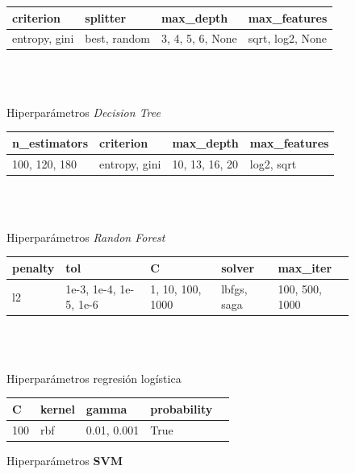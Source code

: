 			\begin{figure}[ht!]
				\centering
				\begin{tabular}{llll}
					\toprule
							criterion &        splitter &           max\_depth &      max\_features \\
					\midrule
					  entropy, gini &  best, random &  3, 4, 5, 6, None &  sqrt, log2, None \\
					\bottomrule
				\end{tabular}\\\\
				\caption{Hiperparámetros \emph{Decision Tree}}
				\label{table:2}
			\end{figure}
			
			\begin{figure}[ht!]
				\centering
				\begin{tabular}{llll}
					\toprule
					     n\_estimators &        criterion &          max\_depth &  max\_features \\
					\midrule
					  100, 120, 180 &  entropy, gini &  10,  13, 16, 20 &  log2, sqrt \\
					\bottomrule
				\end{tabular}\\\\
				\caption{Hiperparámetros \emph{Randon Forest}}
				\label{table:3}
			\end{figure}

			\begin{figure}[ht!]
				\centering
				\begin{tabular}{lllll}
					\toprule
					 penalty &                       tol &                   C &         solver &        max\_iter \\
					\midrule
					    l2 &  1e-3, 1e-4, 1e-5, 1e-6 &  1, 10, 100, 1000 &  lbfgs, saga &  100, 500, 1000 \\
					\bottomrule
				\end{tabular}\\\\
				\caption{Hiperparámetros regresión logística}
				\label{table:4}
			\end{figure}

			\begin{figure}[ht!]
				\centering
				\begin{tabular}{lllll}
					\toprule
					      C & kernel &          gamma &  probability \\
					\midrule
					  100 &  rbf &  0.01, 0.001 &         True \\
					\bottomrule
				\end{tabular}
				\caption{Hiperparámetros \textbf{SVM}}
				\label{table:5}
			\end{figure}




